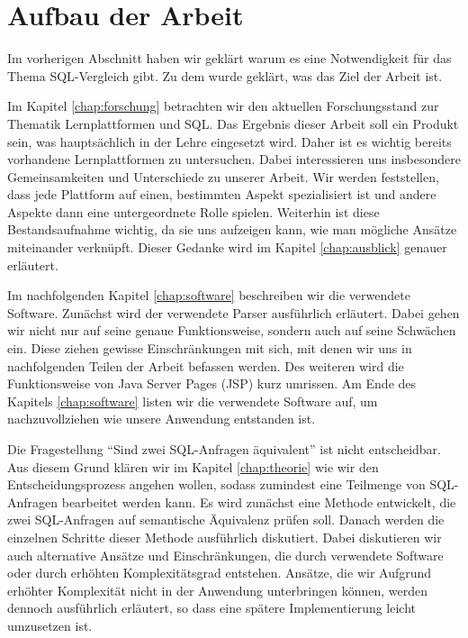 \section{Aufbau der Arbeit}

Im vorherigen Abschnitt haben wir geklärt warum es eine Notwendigkeit für das Thema SQL-Vergleich gibt. Zu dem wurde geklärt, was das Ziel der Arbeit ist. 

Im Kapitel \ref{chap:forschung} betrachten wir den aktuellen Forschungsstand zur Thematik Lernplattformen und SQL. Das Ergebnis dieser Arbeit soll ein Produkt sein, was hauptsächlich in der Lehre eingesetzt wird. Daher ist es wichtig bereits vorhandene Lernplattformen zu untersuchen. Dabei interessieren uns insbesondere Gemeinsamkeiten und Unterschiede zu unserer Arbeit. Wir werden feststellen, dass jede Plattform auf einen, bestimmten Aspekt spezialisiert ist und andere Aspekte dann eine untergeordnete Rolle spielen. Weiterhin ist diese Bestandsaufnahme wichtig, da sie uns aufzeigen kann, wie man mögliche Ansätze miteinander verknüpft. Dieser Gedanke wird im Kapitel \ref{chap:ausblick} genauer erläutert.

Im nachfolgenden Kapitel \ref{chap:software} beschreiben wir die verwendete Software. Zunächst wird der verwendete Parser ausführlich erläutert. Dabei gehen wir nicht nur auf seine genaue Funktionsweise, sondern auch auf seine Schwächen ein. Diese ziehen gewisse Einschränkungen mit sich, mit denen wir uns in nachfolgenden Teilen der Arbeit befassen werden. Des weiteren wird die Funktionsweise von Java Server Pages (JSP) kurz umrissen. Am Ende des Kapitels \ref{chap:software} listen wir die verwendete Software auf, um nachzuvollziehen wie unsere Anwendung entstanden ist.

Die Fragestellung ``Sind zwei SQL-Anfragen äquivalent'' ist nicht entscheidbar. Aus diesem Grund klären wir im Kapitel \ref{chap:theorie} wie wir den Entscheidungsprozess angehen wollen, sodass zumindest eine Teilmenge von SQL-Anfragen bearbeitet werden kann. Es wird zunächst eine Methode entwickelt, die zwei SQL-Anfragen auf semantische Äquivalenz prüfen soll. Danach werden die einzelnen Schritte dieser Methode ausführlich diskutiert. Dabei diskutieren wir auch alternative Ansätze und Einschränkungen, die durch verwendete Software oder durch erhöhten Komplexitätsgrad entstehen. Ansätze, die wir Aufgrund erhöhter Komplexität nicht in der Anwendung unterbringen können, werden dennoch ausführlich erläutert, so dass eine spätere Implementierung leicht umzusetzen ist.

